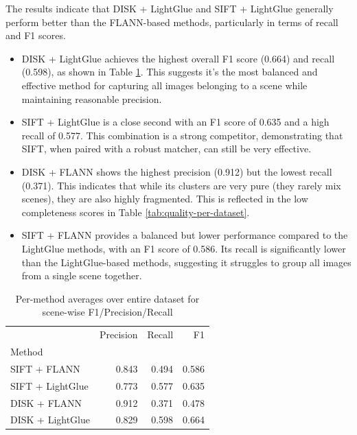 \documentclass[report.tex]{subfiles}
\begin{document}
The results indicate that DISK + LightGlue and SIFT + LightGlue generally perform better than the FLANN-based methods, particularly in terms of recall and F1 scores.

\begin{itemize}
    \item     DISK + LightGlue achieves the highest overall F1 score (0.664) and recall (0.598), as shown in Table \ref{tab:scene-agg-methods}. This suggests it's the most balanced and effective method for capturing all images belonging to a scene while maintaining reasonable precision.
    \item     SIFT + LightGlue is a close second with an F1 score of 0.635 and a high recall of 0.577. This combination is a strong competitor, demonstrating that SIFT, when paired with a robust matcher, can still be very effective.
    \item DISK + FLANN shows the highest precision (0.912) but the lowest recall (0.371). This indicates that while its clusters are very pure (they rarely mix scenes), they are also highly fragmented. This is reflected in the low completeness scores in Table \ref{tab:quality-per-dataset}.
    \item     SIFT + FLANN provides a balanced but lower performance compared to the LightGlue methods, with an F1 score of 0.586. Its recall is significantly lower than the LightGlue-based methods, suggesting it struggles to group all images from a single scene together.
\end{itemize}

\begin{table}
\centering
\begin{tabular}{lrrr}
\toprule
 & Precision & Recall & F1 \\
Method &  &  &  \\
\midrule
SIFT + FLANN & 0.843 & 0.494 & 0.586 \\
SIFT + LightGlue & 0.773 & 0.577 & 0.635 \\
DISK + FLANN & 0.912 & 0.371 & 0.478 \\
DISK + LightGlue & 0.829 & 0.598 & 0.664 \\
\bottomrule
\end{tabular}
\caption{Per-method averages over entire dataset for scene-wise F1/Precision/Recall}
\label{tab:scene-agg-methods}
\end{table}
\end{document}
